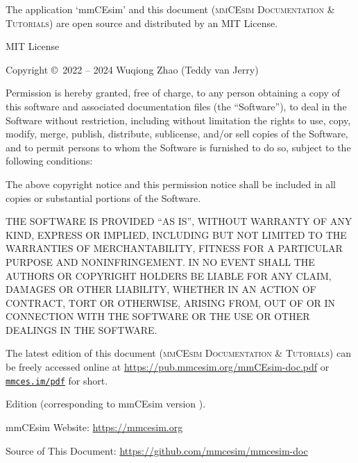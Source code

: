 \vspace*{-\fill}

\noindent
The application `mmCEsim' and this document
(\textsc{mmCEsim Documentation \& Tutorials})
are open source and distributed by an MIT License.
\newline

\noindent
MIT License
\newline

\noindent
Copyright \copyright~2022 -- 2024 Wuqiong Zhao (Teddy van Jerry)
\newline

\noindent
Permission is hereby granted, free of charge, to any person obtaining a copy
of this software and associated documentation files (the ``Software''), to deal
in the Software without restriction, including without limitation the rights
to use, copy, modify, merge, publish, distribute, sublicense, and/or sell
copies of the Software, and to permit persons to whom the Software is
furnished to do so, subject to the following conditions:
\newline

\noindent
The above copyright notice and this permission notice shall be included in all
copies or substantial portions of the Software.
\newline

\noindent
THE SOFTWARE IS PROVIDED ``AS IS'', WITHOUT WARRANTY OF ANY KIND, EXPRESS OR
IMPLIED, INCLUDING BUT NOT LIMITED TO THE WARRANTIES OF MERCHANTABILITY,
FITNESS FOR A PARTICULAR PURPOSE AND NONINFRINGEMENT. IN NO EVENT SHALL THE
AUTHORS OR COPYRIGHT HOLDERS BE LIABLE FOR ANY CLAIM, DAMAGES OR OTHER
LIABILITY, WHETHER IN AN ACTION OF CONTRACT, TORT OR OTHERWISE, ARISING FROM,
OUT OF OR IN CONNECTION WITH THE SOFTWARE OR THE USE OR OTHER DEALINGS IN THE
SOFTWARE.
\newline
\newline

\noindent
The latest edition of this document (\textsc{mmCEsim Documentation \& Tutorials})
can be freely accessed online at \url{https://pub.mmcesim.org/mmCEsim-doc.pdf}
or \href{https://mmces.im/pdf}{\texttt{mmces.im/pdf}} for short.
\newline

\noindent
Edition \mmCEsimDate{}
(corresponding to mmCEsim version \mmCEsimVersion).

\vfill
\noindent
mmCEsim Website: \url{https://mmcesim.org}

\noindent
Source of This Document: \url{https://github.com/mmcesim/mmcesim-doc}
